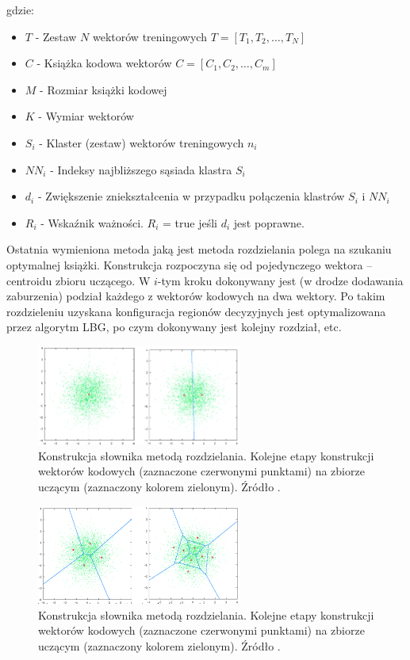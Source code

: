 \documentclass{article}
\begin{document}
gdzie:
\begin{itemize}[label=]
    \item $T$ - Zestaw $N$ wektorów treningowych $T = {[T_{1}, T_{2}, \dots, T_{N}]}$
    \item $C$ - Książka kodowa wektorów $C = {[C_{1}, C_{2}, \dots, C_{m}]}$
    \item $M$ - Rozmiar książki kodowej
    \item $K$ - Wymiar wektorów
    \item $S_{i}$ - Klaster (zestaw) wektorów treningowych $n_{i}$
    \item $NN_{i}$ - Indeksy najbliższego sąsiada klastra $S_{i}$
    \item $d_{i}$ - Zwiększenie zniekształcenia w przypadku połączenia klastrów $S_{i}$ i $NN_{i}$
    \item $R_{i}$ - Wskaźnik ważności. $R_{i}$ = true jeśli $d_{i}$ jest poprawne.
    \cite{tkaukoranta} 
\end{itemize}

Ostatnia wymieniona metoda jaką jest metoda rozdzielania polega na szukaniu optymalnej książki.
Konstrukcja rozpoczyna się od pojedynczego wektora – centroidu zbioru uczącego.
W $i$-tym kroku dokonywany jest (w drodze dodawania zaburzenia) podział każdego z wektorów kodowych na dwa wektory.
Po takim rozdzieleniu uzyskana konfiguracja regionów decyzyjnych jest optymalizowana przez algorytm LBG, po czym dokonywany jest kolejny rozdział, etc.

\begin{figure}[H]
    \centering
    \includegraphics[width=0.6\textwidth]{images/rodzielania_1.png}
    \caption{Konstrukcja słownika metodą rozdzielania. Kolejne etapy konstrukcji wektorów kodowych 
    (zaznaczone czerwonymi punktami) na zbiorze uczącym (zaznaczony kolorem zielonym). Źródło \cite{mwilczewski}.}
    \label{fig:rozdzielania_1}
\end{figure}

\begin{figure}[H]
    \centering
    \includegraphics[width=0.6\textwidth]{images/rodzielania_2.png}
    \caption{Konstrukcja słownika metodą rozdzielania. Kolejne etapy konstrukcji wektorów kodowych 
    (zaznaczone czerwonymi punktami) na zbiorze uczącym (zaznaczony kolorem zielonym). Źródło \cite{mwilczewski}.}
    \label{fig:rozdzielania_2}
\end{figure}
\end{document}
